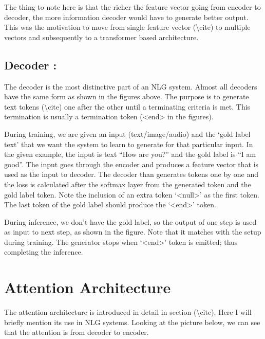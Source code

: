 \documentclass[]{krantz}
\begin{document}
The thing to note here is that the richer the feature vector going from encoder to decoder, the more information decoder would have to generate better output. This was the motivation to move from single feature vector (\textbackslash{}cite) to multiple vectors and subsequently to a transformer based architecture.

\hypertarget{decoder}{%
\subsection{Decoder :}\label{decoder}}

The decoder is the most distinctive part of an NLG system. Almost all decoders have the same form as shown in the figures above. The purpose is to generate text tokens (\textbackslash{}cite) one after the other until a terminating criteria is met. This termination is usually a termination token (\textless{}end\textgreater{} in the figures).

During training, we are given an input (text/image/audio) and the `gold label text' that we want the system to learn to generate for that particular input. In the given example, the input is text ``How are you?'' and the gold label is ``I am good''. The input goes through the encoder and produces a feature vector that is used as the input to decoder. The decoder than generates tokens one by one and the loss is calculated after the softmax layer from the generated token and the gold label token. Note the inclusion of an extra token `\textless{}null\textgreater{}' as the first token. The last token of the gold label should produce the `\textless{}end\textgreater{}' token.

During inference, we don't have the gold label, so the output of one step is used as input to next step, as shown in the figure. Note that it matches with the setup during training. The generator stops when `\textless{}end\textgreater{}' token is emitted; thus completing the inference.

\hypertarget{attention-architecture}{%
\section{Attention Architecture}\label{attention-architecture}}

The attention architecture is introduced in detail in section (\textbackslash{}cite). Here I will briefly mention its use in NLG systems. Looking at the picture below, we can see that the attention is from decoder to encoder.
\end{document}
